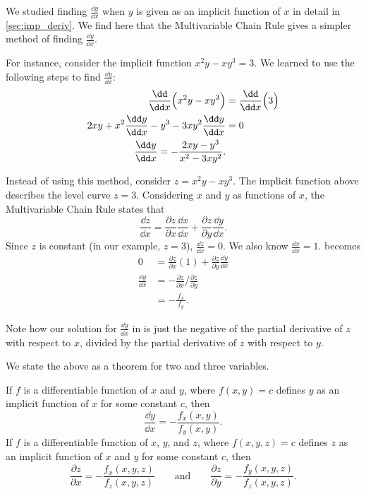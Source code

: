 We studied finding $\frac{\dd y}{\dd x}$ when $y$ is given as an implicit function of $x$ in detail in \autoref{sec:imp_deriv}. We find here that the Multivariable Chain Rule gives a simpler method of finding $\frac{\dd y}{\dd x}$.

For instance, consider the implicit function $x^2y-xy^3=3.$ We learned to use the following steps to find $\frac{\dd y}{\dd x}$:
\begin{align}
\frac{\dd}{\dd x}\Bigl(x^2y-xy^3\Bigr) &= \frac{\dd}{\dd x}\Bigl(3\Bigr) \notag\\
2xy + x^2\frac{\dd y}{\dd x}-y^3-3xy^2\frac{\dd y}{\dd x} &= 0\notag \\
\frac{\dd y}{\dd x} = -\frac{2xy-y^3}{x^2-3xy^2}.\label{eq:mchain2}
\end{align}

Instead of using this method, consider $z=x^2y-xy^3$. The implicit function above describes the level curve $z=3$. Considering $x$ and $y$ as functions of $x$, the Multivariable Chain Rule states that
\begin{equation}
\frac{\dd z}{\dd x} = \frac{\partial z}{\partial x}\frac{\dd x}{\dd x}+\frac{\partial z}{\partial y}\frac{\dd y}{\dd x}.\label{eq:mchain1}
\end{equation}
Since $z$ is constant (in our example, $z=3$), $\frac{\dd z}{\dd x} = 0$. We also know $\frac{\dd x}{\dd x} = 1$.  becomes
\begin{align*}
0 &= \frac{\partial z}{\partial x}(1) + \frac{\partial z}{\partial y}\frac{\dd y}{\dd x} %
\\[5pt]
\frac{\dd y}{\dd x} &= -\frac{\partial z}{\partial x}\Big/\frac{\partial z}{\partial y}\\[5pt]
			&= -\frac{\,f_x\,}{f_y}.
\end{align*}

Note how our solution for $\frac{\dd y}{\dd x}$ in  is just the negative of the partial derivative of $z$ with respect to $x$, divided by the partial derivative of $z$ with respect to $y$.

We state the above as a theorem for two and three variables.

\begin{theorem}\label{thm:implicit_deriv_chain}%
If $f$ is a differentiable function of $x$ and $y$, where $f(x,y)=c$ defines $y$ as  an implicit function of $x$ for some constant $c$, then
\[\frac{\dd y}{\dd x} = - \frac{f_x(x,y)}{f_y(x,y)}.\]
If $f$ is a differentiable function of $x$, $y$, and $z$, where $f(x,y,z)=c$ defines $z$ as an implicit function of $x$ and $y$ for some constant $c$, then
\[
\frac{\partial z}{\partial x}=-\frac{f_x(x,y,z)}{f_z(x,y,z)}
\qquad\text{and}\qquad
\frac{\partial z}{\partial y}=-\frac{f_y(x,y,z)}{f_z(x,y,z)}.
\]
\end{theorem}

